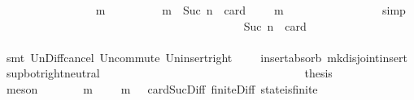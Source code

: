\begin{isabellebody}
\ \ \ \ \ \ \ \ \ \ \ \ \ \ \isamarkupfalse%
\ {\isacartoucheopen}{\isasymforall}\ m\ {\isasymin}\ {\isasymsigma}\ {\isacharminus}\ {\isasymsigma}{\isacharprime}{\isachardot}\ {\isasymnot}\ {\isasymsigma}\ {\isasymsubseteq}\ {\isasymsigma}{\isacharprime}\ {\isasymunion}\ {\isacharbraceleft}m{\isacharbraceright}\ {\isasymand}\ Suc\ n\ {\isacharequal}\ card\ {\isacharparenleft}{\isasymsigma}\ {\isacharminus}\ {\isacharparenleft}{\isasymsigma}{\isacharprime}\ {\isasymunion}\ {\isacharbraceleft}m{\isacharbraceright}{\isacharparenright}{\isacharparenright}{\isacartoucheclose}\ \isanewline
\ \ \ \ \ \ \ \ \ \ \ \ \ \ \isamarkupfalse%
\ simp\isanewline
\ \ \ \ \ \ \ \ \ \ \ \ \isamarkupfalse%
\ \isamarkupfalse%
\ {\isachardoublequoteopen}{\isasymsigma}\ {\isasymunion}\ {\isasymsigma}{\isacharprime}\ {\isasymin}\ {\isasymSigma}{\isachardoublequoteclose}\isanewline
\ \ \ \ \ \ \ \ \ \ \ \ \ \ \isamarkupfalse%
\ {\isacartoucheopen}{\isasymforall}{\isasymsigma}{\isasymin}{\isasymSigma}{\isachardot}\ {\isasymforall}{\isasymsigma}{\isacharprime}{\isasymin}{\isasymSigma}{\isachardot}\ {\isasymnot}\ {\isasymsigma}\ {\isasymsubseteq}\ {\isasymsigma}{\isacharprime}\ {\isasymand}\ Suc\ n\ {\isacharequal}\ card\ {\isacharparenleft}{\isasymsigma}\ {\isacharminus}\ {\isasymsigma}{\isacharprime}{\isacharparenright}\ {\isasymlongrightarrow}\ {\isasymsigma}\ {\isasymunion}\ {\isasymsigma}{\isacharprime}\ {\isasymin}\ {\isasymSigma}{\isacartoucheclose}\isanewline
\ \ \ \ \ \ \ \ \ \ \ \ \ \ \isamarkupfalse%
\ {\isacharparenleft}smt\ Un{\isacharunderscore}Diff{\isacharunderscore}cancel\ Un{\isacharunderscore}commute\ Un{\isacharunderscore}insert{\isacharunderscore}right\ \ {\isacartoucheopen}{\isasymsigma}\ {\isasymin}\ {\isasymSigma}{\isacartoucheclose}\ insert{\isacharunderscore}absorb{}\ mk{\isacharunderscore}disjoint{\isacharunderscore}insert\ sup{\isacharunderscore}bot{\isachardot}right{\isacharunderscore}neutral{\isacharparenright}\isanewline
\ \ \ \ \ \ \ \ \ \ \isamarkupfalse%
\isanewline
\ \ \ \ \ \ \ \ \isamarkupfalse%
\isanewline
\ \ \ \ \ \ \isamarkupfalse%
\isanewline
\ \ \ \ \ \ \isamarkupfalse%
\ \isamarkupfalse%
\ {\isacharquery}thesis\isanewline
\ \ \ \ \ \ \ \ \isamarkupfalse%
\ {\isacharparenleft}meson\ {\isacartoucheopen}{\isasymforall}{\isasymsigma}{\isasymin}{\isasymSigma}{\isachardot}\ {\isasymforall}{\isasymsigma}{\isacharprime}{\isasymin}{\isasymSigma}{\isachardot}\ {\isasymnot}\ {\isasymsigma}\ {\isasymsubseteq}\ {\isasymsigma}{\isacharprime}\ {\isasymlongrightarrow}\ {\isacharparenleft}{\isasymexists}m{\isasymin}{\isasymsigma}\ {\isacharminus}\ {\isasymsigma}{\isacharprime}{\isachardot}\ {\isasymsigma}{\isacharprime}\ {\isasymunion}\ {\isacharbraceleft}m{\isacharbraceright}\ {\isasymin}\ {\isasymSigma}{\isacharparenright}{\isacartoucheclose}\ card{\isacharunderscore}Suc{\isacharunderscore}Diff{}\ finite{\isacharunderscore}Diff\ state{\isacharunderscore}is{\isacharunderscore}finite{\isacharparenright}\isanewline

\end{isabellebody}
